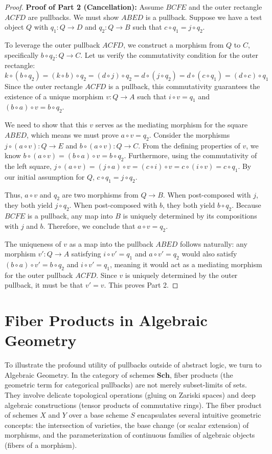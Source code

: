 \begin{proof}
\textbf{Proof of Part 2 (Cancellation):} 
Assume $BCFE$ and the outer rectangle $ACFD$ are pullbacks. We must show $ABED$ is a pullback.
Suppose we have a test object $Q$ with $q_1: Q \to D$ and $q_2: Q \to B$ such that $c \circ q_1 = j \circ q_2$.

To leverage the outer pullback $ACFD$, we construct a morphism from $Q$ to $C$, specifically $b \circ q_2: Q \to C$. Let us verify the commutativity condition for the outer rectangle:
\[
k \circ (b \circ q_2) = (k \circ b) \circ q_2 = (d \circ j) \circ q_2 = d \circ (j \circ q_2) = d \circ (c \circ q_1) = (d \circ c) \circ q_1
\]
Since the outer rectangle $ACFD$ is a pullback, this commutativity guarantees the existence of a unique morphism $v: Q \to A$ such that $i \circ v = q_1$ and $(b \circ a) \circ v = b \circ q_2$.

We need to show that this $v$ serves as the mediating morphism for the square $ABED$, which means we must prove $a \circ v = q_2$.
Consider the morphisms $j \circ (a \circ v): Q \to E$ and $b \circ (a \circ v): Q \to C$.
From the defining properties of $v$, we know $b \circ (a \circ v) = (b \circ a) \circ v = b \circ q_2$.
Furthermore, using the commutativity of the left square, $j \circ (a \circ v) = (j \circ a) \circ v = (c \circ i) \circ v = c \circ (i \circ v) = c \circ q_1$. By our initial assumption for $Q$, $c \circ q_1 = j \circ q_2$.

Thus, $a \circ v$ and $q_2$ are two morphisms from $Q \to B$. When post-composed with $j$, they both yield $j \circ q_2$. When post-composed with $b$, they both yield $b \circ q_2$. 
Because $BCFE$ is a pullback, any map into $B$ is uniquely determined by its compositions with $j$ and $b$. Therefore, we conclude that $a \circ v = q_2$.

The uniqueness of $v$ as a map into the pullback $ABED$ follows naturally: any morphism $v': Q \to A$ satisfying $i \circ v' = q_1$ and $a \circ v' = q_2$ would also satisfy $(b \circ a) \circ v' = b \circ q_2$ and $i \circ v' = q_1$, meaning it would act as a mediating morphism for the outer pullback $ACFD$. Since $v$ is uniquely determined by the outer pullback, it must be that $v' = v$. This proves Part 2.
\end{proof}


\section{Fiber Products in Algebraic Geometry}

To illustrate the profound utility of pullbacks outside of abstract logic, we turn to Algebraic Geometry. In the category of schemes $\mathbf{Sch}$, fiber products (the geometric term for categorical pullbacks) are not merely subset-limits of sets. They involve delicate topological operations (gluing on Zariski spaces) and deep algebraic constructions (tensor products of commutative rings). The fiber product of schemes $X$ and $Y$ over a base scheme $S$ encapsulates several intuitive geometric concepts: the intersection of varieties, the base change (or scalar extension) of morphisms, and the parameterization of continuous families of algebraic objects (fibers of a morphism).

